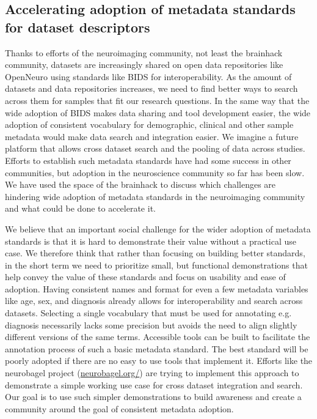 \documentclass[../main.tex]{subfiles}
\begin{document}
\subsection{Accelerating adoption of metadata standards for dataset descriptors}\label{sec:metadata}


Thanks to efforts of the neuroimaging community, not least the brainhack community\citep{Gau2021}, datasets are increasingly shared on open data repositories like OpenNeuro\citep{Markiewicz2021-bf} using standards like BIDS\citep{Gorgolewski2016} for interoperability. As the amount of datasets and data repositories increases, we need to find better ways to search across them for samples that fit our research questions. In the same way that the wide adoption of BIDS makes data sharing and tool development easier, the wide adoption of consistent vocabulary for demographic, clinical and other sample metadata would make data search and integration easier. We imagine a future platform that allows cross dataset search and the pooling of data across studies. Efforts to establish such metadata standards have had some success in other communities\citep{Field2008-kw, Stang2010-nl}, but adoption in the neuroscience community so far has been slow. We have used the space of the brainhack to discuss which challenges are hindering wide adoption of metadata standards in the neuroimaging community and what could be done to accelerate it.

We believe that an important social challenge for the wider adoption of metadata standards is that it is hard to demonstrate their value without a practical use case. We therefore think that rather than focusing on building better standards, in the short term we need to prioritize small, but functional demonstrations that help convey the value of these standards and focus on usability and ease of adoption. Having consistent names and format for even a few metadata variables like age, sex, and diagnosis already allows for interoperability and search across datasets. Selecting a single vocabulary that must be used for annotating e.g. diagnosis necessarily lacks some precision but avoids the need to align slightly different versions of the same terms. Accessible tools can be built to facilitate the annotation process of such a basic metadata standard. The best standard will be poorly adopted if there are no easy to use tools that implement it. Efforts like the neurobagel project (\url{neurobagel.org/}) are trying to implement this approach to demonstrate a simple working use case for cross dataset integration and search. Our goal is to use such simpler demonstrations to build awareness and create a community around the goal of consistent metadata adoption.
\end{document}
